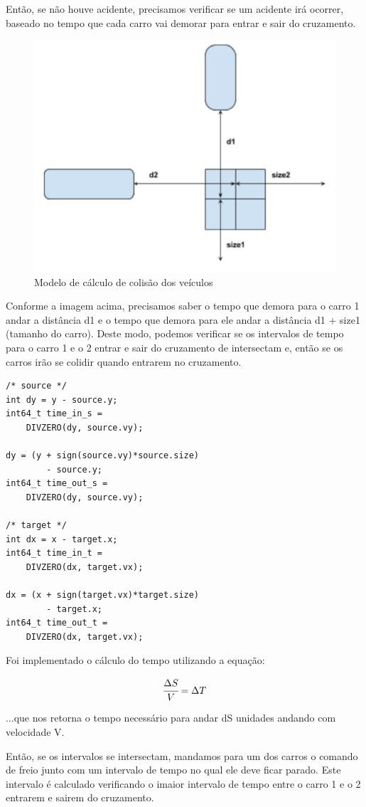 \documentclass[10pt,twocolumn,letterpaper]{article}
\begin{document}
    Então, se não houve acidente, precisamos verificar se um acidente irá ocorrer, baseado no tempo que cada carro vai demorar para entrar e sair do cruzamento.

\begin{figure}[ht!]
    \center\includegraphics[width=.5\hsize]{img/car-cal}
    \caption{Modelo de cálculo de colisão dos veículos}
\end{figure}

    Conforme a imagem acima, precisamos saber o tempo que demora para o carro 1 andar a distância d1  e o tempo que demora para ele andar a distância d1 + size1 (tamanho do carro). Deste modo, podemos verificar se os intervalos de tempo para o carro 1 e o 2 entrar e sair do cruzamento de intersectam e, então se os carros irão se colidir quando entrarem no cruzamento.

\begin{lstlisting}[caption={Continuação do algoritmo de detecção de colisão (2)}, label=Algorithm]
/* source */
int dy = y - source.y;
int64_t time_in_s = 
    DIVZERO(dy, source.vy);

dy = (y + sign(source.vy)*source.size) 
        - source.y;
int64_t time_out_s =
    DIVZERO(dy, source.vy);

/* target */
int dx = x - target.x;
int64_t time_in_t = 
    DIVZERO(dx, target.vx);

dx = (x + sign(target.vx)*target.size) 
        - target.x;
int64_t time_out_t = 
    DIVZERO(dx, target.vx);
\end{lstlisting}

Foi implementado o cálculo do tempo utilizando a equação:

\begin{equation}
\cfrac{\Delta S}{V} = \Delta T
\end{equation}

    ...que nos retorna o tempo necessário para andar dS unidades andando com velocidade V.
    
    Então, se os intervalos se intersectam, mandamos para um dos carros o comando de freio junto com um intervalo de tempo no qual ele deve ficar parado. Este intervalo é calculado verificando o imaior intervalo de tempo entre o carro 1 e o 2 entrarem e sairem do cruzamento.
\end{document}
